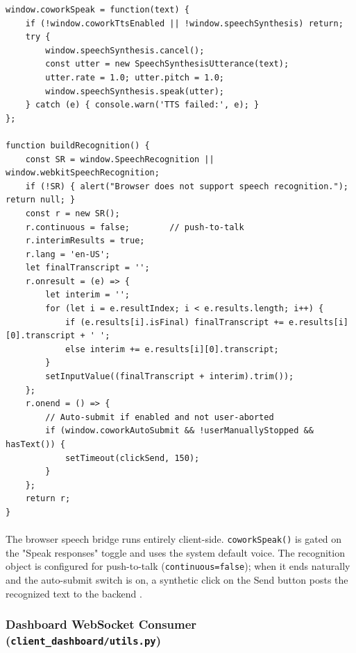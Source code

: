 \documentclass{article}
\begin{document}
\begin{lstlisting}[style=codeblock]
window.coworkSpeak = function(text) {
    if (!window.coworkTtsEnabled || !window.speechSynthesis) return;
    try {
        window.speechSynthesis.cancel();
        const utter = new SpeechSynthesisUtterance(text);
        utter.rate = 1.0; utter.pitch = 1.0;
        window.speechSynthesis.speak(utter);
    } catch (e) { console.warn('TTS failed:', e); }
};

function buildRecognition() {
    const SR = window.SpeechRecognition || window.webkitSpeechRecognition;
    if (!SR) { alert("Browser does not support speech recognition."); return null; }
    const r = new SR();
    r.continuous = false;        // push-to-talk
    r.interimResults = true;
    r.lang = 'en-US';
    let finalTranscript = '';
    r.onresult = (e) => {
        let interim = '';
        for (let i = e.resultIndex; i < e.results.length; i++) {
            if (e.results[i].isFinal) finalTranscript += e.results[i][0].transcript + ' ';
            else interim += e.results[i][0].transcript;
        }
        setInputValue((finalTranscript + interim).trim());
    };
    r.onend = () => {
        // Auto-submit if enabled and not user-aborted
        if (window.coworkAutoSubmit && !userManuallyStopped && hasText()) {
            setTimeout(clickSend, 150);
        }
    };
    return r;
}
\end{lstlisting}

\paragraph{}
The browser speech bridge runs entirely client-side. \texttt{coworkSpeak()} is gated on the "Speak responses" toggle and uses the system default voice. The recognition object is configured for push-to-talk (\texttt{continuous=false}); when it ends naturally and the auto-submit switch is on, a synthetic click on the Send button posts the recognized text to the backend \cite{Beloki2017ASA,Stokes2015ScalingNA}.

\subsubsection{Dashboard WebSocket Consumer (\texttt{client\_dashboard/utils.py})}
\end{document}
